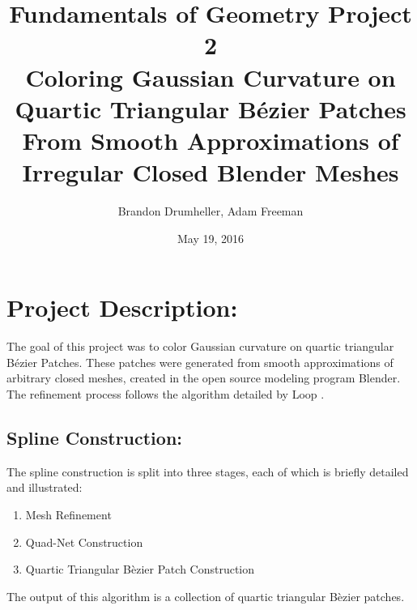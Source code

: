 \documentclass[11pt]{article}
\title{{\bf Fundamentals of Geometry Project 2}\\Coloring Gaussian Curvature on Quartic Triangular B\'ezier Patches\\ From Smooth Approximations of Irregular Closed Blender Meshes\vspace{-0.25in}}
\author{Brandon Drumheller, Adam Freeman}
\date{\vspace{-0.25in}May 19, 2016}
\begin{document}
	\maketitle
	\section*{Project Description:}
	\vspace{-0.2in} 
	The goal of this project was to color Gaussian curvature on quartic triangular B\'ezier Patches. These patches were generated from smooth approximations of arbitrary closed meshes, created in the open source modeling program Blender. The refinement process follows the algorithm detailed by Loop \cite{loop1994smooth}. 
	
	\subsection*{Spline Construction:}
	\vspace{-0.1in}
	The spline construction is split into three stages, each of  which is briefly detailed and illustrated:
	\vspace{-0.1in}
	\begin{enumerate}
		\item Mesh Refinement
		\item Quad-Net Construction
		\item Quartic Triangular B\`ezier Patch Construction
	\end{enumerate}
	The output of this algorithm is a collection of quartic triangular B\`ezier patches.
	
\end{document}
